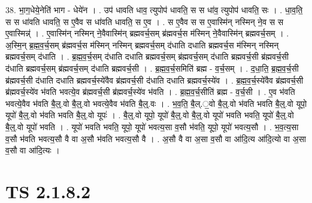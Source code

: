 \documentclass[17pt]{extarticle}
\begin{document}
38. भा॒ग॒धेये॒नेति॑ भाग - धेये॑न । . उप॑ धावति धाव॒ त्युपोप॑ धावति॒ स स धा॑व॒ त्युपोप॑ धावति॒ सः । . धा॒व॒ति॒ स स धा॑वति धावति॒ स ए॒वैव स धा॑वति धावति॒ स ए॒व । . स ए॒वैव स स ए॒वास्मि॑न् नस्मिन् ने॒व स स ए॒वास्मिन्न्॑ । . ए॒वास्मि॑न् नस्मिन् ने॒वैवास्मि॑न् ब्रह्मवर्च॒सम् ब्र॑ह्मवर्च॒स म॑स्मिन् ने॒वैवास्मि॑न् ब्रह्मवर्च॒सम् । . अ॒स्मि॒न् ब्र॒ह्म॒व॒र्च॒सम् ब्र॑ह्मवर्च॒स म॑स्मिन् नस्मिन् ब्रह्मवर्च॒सम् द॑धाति दधाति ब्रह्मवर्च॒स म॑स्मिन् नस्मिन् ब्रह्मवर्च॒सम् द॑धाति । . ब्र॒ह्म॒व॒र्च॒सम् द॑धाति दधाति ब्रह्मवर्च॒सम् ब्र॑ह्मवर्च॒सम् द॑धाति ब्रह्मवर्च॒सी ब्र॑ह्मवर्च॒सी द॑धाति ब्रह्मवर्च॒सम् ब्र॑ह्मवर्च॒सम् द॑धाति ब्रह्मवर्च॒सी । . ब्र॒ह्म॒व॒र्च॒समिति॑ ब्रह्म - व॒र्च॒सम् । . द॒धा॒ति॒ ब्र॒ह्म॒व॒र्च॒सी ब्र॑ह्मवर्च॒सी द॑धाति दधाति ब्रह्मवर्च॒स्ये॑वैव ब्र॑ह्मवर्च॒सी द॑धाति दधाति ब्रह्मवर्च॒स्ये॑व । . ब्र॒ह्म॒व॒र्च॒स्ये॑वैव ब्र॑ह्मवर्च॒सी ब्र॑ह्मवर्च॒स्ये॑व भ॑वति भवत्ये॒व ब्र॑ह्मवर्च॒सी ब्र॑ह्मवर्च॒स्ये॑व भ॑वति । . ब्र॒ह्म॒व॒र्च॒सीति॑ ब्रह्म - व॒र्च॒सी । . ए॒व भ॑वति भवत्ये॒वैव भ॑वति बै॒ल्॒.वो बै॒ल्॒.वो भवत्ये॒वैव भ॑वति बै॒ल्॒.वः । . भ॒व॒ति॒ बै॒ल्.॒वो बै॒ल्॒.वो भ॑वति भवति बै॒ल्॒.वो यूपो॒ यूपो॑ बै॒ल्॒.वो भ॑वति भवति बै॒ल्॒.वो यूपः॑ । . बै॒ल्॒.वो यूपो॒ यूपो॑ बै॒ल्॒.वो बै॒ल्॒.वो यूपो॑ भवति भवति॒ यूपो॑ बै॒ल्॒.वो बै॒ल्॒.वो यूपो॑ भवति । . यूपो॑ भवति भवति॒ यूपो॒ यूपो॑ भवत्य॒सा व॒सौ भ॑वति॒ यूपो॒ यूपो॑ भवत्य॒सौ । . भ॒व॒त्य॒सा व॒सौ भ॑वति भवत्य॒सौ वै वा अ॒सौ भ॑वति भवत्य॒सौ वै । . अ॒सौ वै वा अ॒सा व॒सौ वा आ॑दि॒त्य आ॑दि॒त्यो वा अ॒सा व॒सौ वा आ॑दि॒त्यः । \newline
\pagebreak
{}

\section{ TS 2.1.8.2 }
\end{document}

